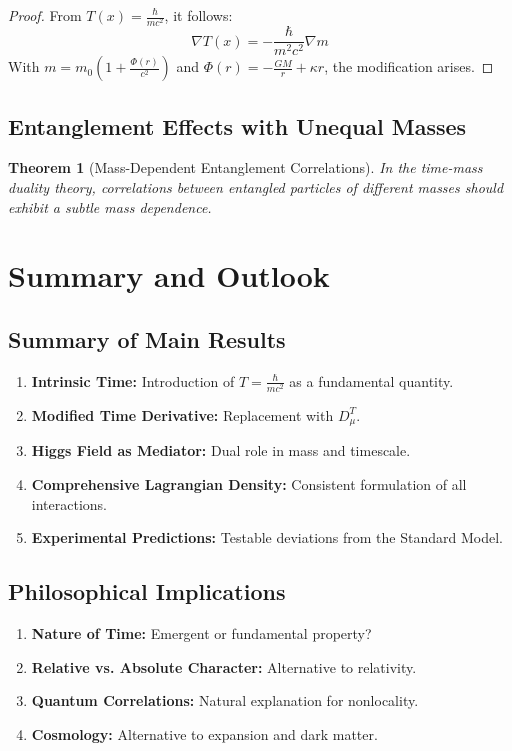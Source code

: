 \documentclass[a4paper,12pt]{article}
\newtheorem{theorem}{Theorem}[section]
\begin{document}
	\begin{proof}
		From \( T(x) = \frac{\hbar}{m c^2} \), it follows:
		\begin{equation}
			\nabla T(x) = -\frac{\hbar}{m^2 c^2} \nabla m
		\end{equation}
		With \( m = m_0 (1 + \frac{\Phi(r)}{c^2}) \) and \( \Phi(r) = -\frac{G M}{r} + \kappa r \), the modification arises.
	\end{proof}
	
	\subsection{Entanglement Effects with Unequal Masses}
	
	\begin{theorem}[Mass-Dependent Entanglement Correlations]
		In the time-mass duality theory, correlations between entangled particles of different masses should exhibit a subtle mass dependence.
	\end{theorem}
	
	\section{Summary and Outlook}
	
	\subsection{Summary of Main Results}
	
	\begin{enumerate}
		\item \textbf{Intrinsic Time:} Introduction of \( T = \frac{\hbar}{m c^2} \) as a fundamental quantity.
		\item \textbf{Modified Time Derivative:} Replacement with \( D_\mu^T \).
		\item \textbf{Higgs Field as Mediator:} Dual role in mass and timescale.
		\item \textbf{Comprehensive Lagrangian Density:} Consistent formulation of all interactions.
		\item \textbf{Experimental Predictions:} Testable deviations from the Standard Model.
	\end{enumerate}
	
	\subsection{Philosophical Implications}
	
	\begin{enumerate}
		\item \textbf{Nature of Time:} Emergent or fundamental property?
		\item \textbf{Relative vs. Absolute Character:} Alternative to relativity.
		\item \textbf{Quantum Correlations:} Natural explanation for nonlocality.
		\item \textbf{Cosmology:} Alternative to expansion and dark matter.
	\end{enumerate}
	
\end{document}
